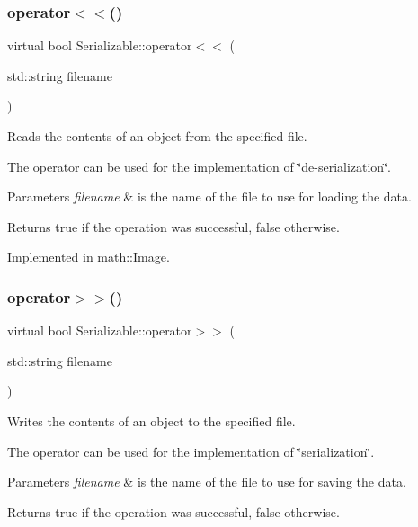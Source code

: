 \subsubsection{\texorpdfstring{operator$<$$<$()}{operator<<()}}
{\footnotesize\ttfamily virtual bool Serializable\+::operator$<$$<$ (\begin{DoxyParamCaption}\item[{std\+::string}]{filename }\end{DoxyParamCaption})\hspace{0.3cm}{\ttfamily [pure virtual]}}

Reads the contents of an object from the specified file.

The operator can be used for the implementation of \char`\"{}de-\/serialization\char`\"{}.


\begin{DoxyParams}{Parameters}
{\em filename} & is the name of the file to use for loading the data.\\
\hline
\end{DoxyParams}
\begin{DoxyReturn}{Returns}
true if the operation was successful, false otherwise. 
\end{DoxyReturn}


Implemented in \hyperlink{classmath_1_1_image_a152102a0b98f58cd4bb6206353fb0a4f}{math\+::\+Image}.

\mbox{\label{class_serializable_a60c53d8ec7e38531699d1ca19642318d}} 
\subsubsection{\texorpdfstring{operator$>$$>$()}{operator>>()}}
{\footnotesize\ttfamily virtual bool Serializable\+::operator$>$$>$ (\begin{DoxyParamCaption}\item[{std\+::string}]{filename }\end{DoxyParamCaption})\hspace{0.3cm}{\ttfamily [pure virtual]}}

Writes the contents of an object to the specified file.

The operator can be used for the implementation of \char`\"{}serialization\char`\"{}.


\begin{DoxyParams}{Parameters}
{\em filename} & is the name of the file to use for saving the data.\\
\hline
\end{DoxyParams}
\begin{DoxyReturn}{Returns}
true if the operation was successful, false otherwise. 
\end{DoxyReturn}



